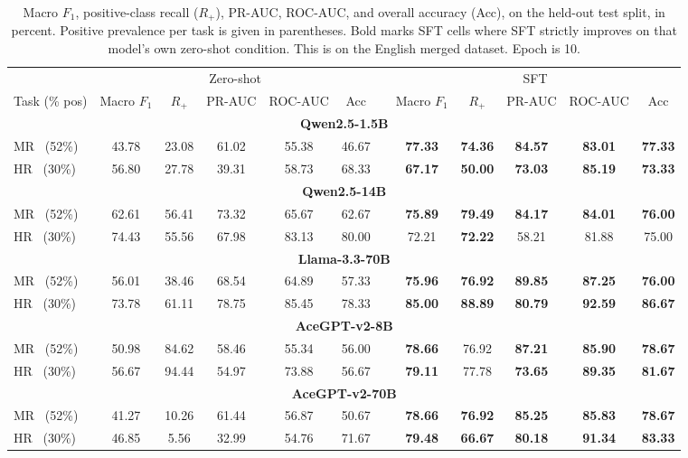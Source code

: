 \begin{table}[!htbp]
\centering
\caption{Macro $F_1$, positive-class recall ($R_{+}$), PR-AUC, ROC-AUC,
and overall accuracy (Acc), on the held-out test split, in percent. Positive prevalence
per task is given in parentheses. Bold marks SFT cells where
SFT strictly improves on that model's own zero-shot condition. This is on the English merged dataset. Epoch is 10.}
\label{tab:llm-results-merged-en-ep10}
\setlength{\tabcolsep}{5pt}
\small
\begin{tabular}{l ccccc c ccccc}
\toprule
 & \multicolumn{5}{c}{Zero-shot} & & \multicolumn{5}{c}{SFT} \\
\cmidrule(lr){2-6}\cmidrule(lr){8-12}
Task (\% pos)
 & Macro $F_1$ & $R_{+}$ & PR-AUC & ROC-AUC & Acc & & Macro $F_1$ & $R_{+}$ & PR-AUC & ROC-AUC & Acc \\
\midrule
\multicolumn{12}{c}{\textbf{Qwen2.5-1.5B}} \\
\midrule
MR \ (52\%) & 43.78 & 23.08 & 61.02 & 55.38 & 46.67 & & \textbf{77.33} & \textbf{74.36} & \textbf{84.57} & \textbf{83.01} & \textbf{77.33} \\
HR \ (30\%) & 56.80 & 27.78 & 39.31 & 58.73 & 68.33 & & \textbf{67.17} & \textbf{50.00} & \textbf{73.03} & \textbf{85.19} & \textbf{73.33} \\
\midrule
\midrule
\multicolumn{12}{c}{\textbf{Qwen2.5-14B}} \\
\midrule
MR \ (52\%) & 62.61 & 56.41 & 73.32 & 65.67 & 62.67 & & \textbf{75.89} & \textbf{79.49} & \textbf{84.17} & \textbf{84.01} & \textbf{76.00} \\
HR \ (30\%) & 74.43 & 55.56 & 67.98 & 83.13 & 80.00 & & 72.21 & \textbf{72.22} & 58.21 & 81.88 & 75.00 \\
\midrule
\midrule
\multicolumn{12}{c}{\textbf{Llama-3.3-70B}} \\
\midrule
MR \ (52\%) & 56.01 & 38.46 & 68.54 & 64.89 & 57.33 & & \textbf{75.96} & \textbf{76.92} & \textbf{89.85} & \textbf{87.25} & \textbf{76.00} \\
HR \ (30\%) & 73.78 & 61.11 & 78.75 & 85.45 & 78.33 & & \textbf{85.00} & \textbf{88.89} & \textbf{80.79} & \textbf{92.59} & \textbf{86.67} \\
\midrule
\midrule
\multicolumn{12}{c}{\textbf{AceGPT-v2-8B}} \\
\midrule
MR \ (52\%) & 50.98 & 84.62 & 58.46 & 55.34 & 56.00 & & \textbf{78.66} & 76.92 & \textbf{87.21} & \textbf{85.90} & \textbf{78.67} \\
HR \ (30\%) & 56.67 & 94.44 & 54.97 & 73.88 & 56.67 & & \textbf{79.11} & 77.78 & \textbf{73.65} & \textbf{89.35} & \textbf{81.67} \\
\midrule
\midrule
\multicolumn{12}{c}{\textbf{AceGPT-v2-70B}} \\
\midrule
MR \ (52\%) & 41.27 & 10.26 & 61.44 & 56.87 & 50.67 & & \textbf{78.66} & \textbf{76.92} & \textbf{85.25} & \textbf{85.83} & \textbf{78.67} \\
HR \ (30\%) & 46.85 & 5.56 & 32.99 & 54.76 & 71.67 & & \textbf{79.48} & \textbf{66.67} & \textbf{80.18} & \textbf{91.34} & \textbf{83.33} \\
\bottomrule
\end{tabular}
\end{table}

